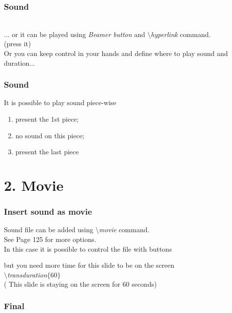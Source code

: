 \documentclass[envcountsect]{beamer}
\begin{document}
\begin{frame}
\frametitle{Sound} \transblindsvertical {}
\\

... or it can be played using {\it Beamer button} and {\it $\setminus$hyperlink} command.\\
 (press it)\\

 \vspace{10pt}
 Or you can keep control in your hands and define where
to play sound and duration...
\transwipe {}
\end{frame}
\begin{frame}
\frametitle{Sound} \transblindshorizontal
\begin{theorem}
It is possible to play sound piece-wise
\begin{enumerate}
\item<1-> present the 1st piece;
\item<2-> no sound on this piece;
\item<3-> present the last piece
\end{enumerate}
\end{theorem}
\end{frame}


\section{2. Movie}

\begin{frame}
\frametitle{Insert sound as movie}
\transglitter {}
Sound file can be added using {\it $\setminus$movie} command.\\
 See Page 125 for more options.\\

In this case it is possible to control  the file with buttons\\


but you need more time for this slide to be on the screen\\
{\it $\setminus$transduration$\{60\}$}  \\

  ( This slide is staying on the screen for  60 seconds)


\end{frame}

\begin{frame}
\frametitle{Final}
\transglitter
{}


\end{frame}
\end{document}

